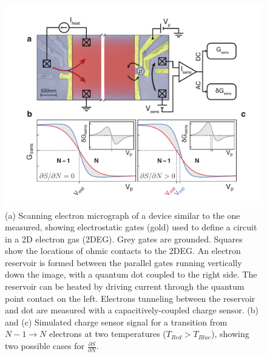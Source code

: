 \documentclass[twocolumn,showpacs,amsmath,amssymb,prl,aps,superscriptaddress]{revtex4-1}
\begin{document}
\begin{figure}[!]
        \includegraphics[width=1.0\columnwidth]{../figures/figure_1_annotated.pdf}
        \caption{\label{fig:fig1}(a) Scanning electron micrograph of a device similar to the one measured, showing electrostatic gates (gold) used to define a circuit in a 2D electron gas (2DEG). Grey gates are grounded. Squares show the locations of ohmic contacts to the 2DEG. An electron reservoir is formed between the parallel gates running vertically down the image, with a quantum dot coupled to the right side. The reservoir can be heated by driving current through the quantum point contact on the left.  Electrons tunneling between the reservoir and dot are measured with a capacitively-coupled charge sensor. (b) and (c) Simulated charge sensor signal for a transition from $N-1 \rightarrow N$ electrons at two temperatures ($T_{Red} > T_{Blue}$), showing two possible cases for $\frac{\partial S}{\partial N}$.}
\end{figure}

\end{document}
